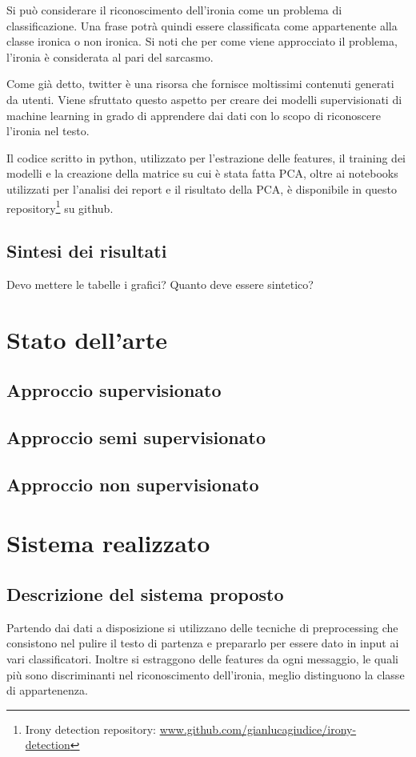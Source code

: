 \documentclass[oneside]{book}
\begin{document}
Si può considerare il riconoscimento dell'ironia come un problema di classificazione. Una frase potrà quindi essere classificata come appartenente alla classe ironica o non ironica. Si noti che per come viene approcciato il problema, l'ironia è considerata al pari del sarcasmo.

Come già detto, twitter è una risorsa che fornisce moltissimi contenuti generati da utenti. Viene sfruttato questo aspetto per creare dei modelli supervisionati di machine learning in grado di apprendere dai dati con lo scopo di riconoscere l'ironia nel testo.

Il codice scritto in python, utilizzato per l'estrazione delle features, il training dei modelli e la creazione della matrice su cui è stata fatta PCA, oltre ai notebooks utilizzati per l'analisi dei report e il risultato della PCA, è disponibile in questo repository\footnote{Irony detection repository: \url{www.github.com/gianlucagiudice/irony-detection}} su github.



\section*{Sintesi dei risultati}
Devo mettere le tabelle i grafici? Quanto deve essere sintetico?


\chapter{Stato dell'arte}

\section{Approccio supervisionato}

\section{Approccio semi supervisionato}

\section{Approccio non supervisionato}


\chapter{Sistema realizzato}

\section{Descrizione del sistema proposto}
Partendo dai dati a disposizione si utilizzano delle tecniche di preprocessing che consistono nel pulire il testo di partenza e prepararlo per essere dato in input ai vari classificatori. Inoltre si estraggono delle features da ogni messaggio, le quali più sono discriminanti nel riconoscimento dell'ironia, meglio distinguono la classe di appartenenza.
\end{document}
